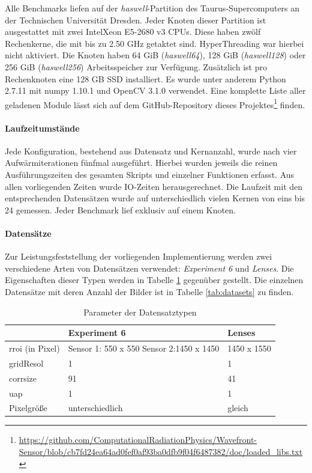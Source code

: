 \begin{sloppypar}
Alle Benchmarks liefen auf der \textit{haswell}-Partition des Taurus-Supercomputers an der Technischen Universität Dresden. Jeder Knoten dieser Partition ist ausgestattet mit zwei Intel\textregistered \mbox{Xeon\textregistered} E5-2680 v3 \glspl{CPU}. Diese haben zwölf Rechenkerne, die mit bis zu 2.50 \gls{GHz} getaktet sind. HyperThreading war hierbei nicht aktiviert. Die Knoten haben 64 \gls{GiB} (\textit{haswell64}), 128 \gls{GiB} (\textit{haswell128}) oder 256 \gls{GiB} (\textit{haswell256}) Arbeitsspeicher zur Verfügung. Zusätzlich ist pro Rechenknoten eine 128 \gls{GB} \gls{SSD} installiert. Es wurde unter anderem Python 2.7.11 mit numpy 1.10.1 und OpenCV 3.1.0 verwendet. Eine komplette Liste aller geladenen Module lässt sich auf dem GitHub-Repository dieses Projektes\footnote{\url{https://github.com/ComputationalRadiationPhysics/Wavefront-Sensor/blob/cb7fd24ea64ad0fef0af93ba0dfb9f04f6487382/doc/loaded_libs.txt}} finden.
\end{sloppypar}

\paragraph{Laufzeitumstände}

Jede Konfiguration, bestehend aus Datensatz und Kernanzahl, wurde nach vier Aufwärmiterationen fünfmal ausgeführt. Hierbei wurden jeweils die reinen Ausführungszeiten des gesamten Skripts und einzelner Funktionen erfasst. Aus allen vorliegenden Zeiten wurde \gls{IO}-Zeiten herausgerechnet. Die Laufzeit mit den entsprechenden Datensätzen wurde auf unterschiedlich vielen Kernen von eins bis 24 gemessen. Jeder Benchmark lief exklusiv auf einem Knoten. 

\paragraph{Datensätze}

Zur Leistungsfeststellung der vorliegenden Implementierung werden zwei verschiedene Arten von Datensätzen verwendet: \textit{Experiment 6} und \textit{Lenses}. Die Eigenschaften dieser Typen werden in Tabelle \ref{tab:dataset_types} gegenüber gestellt. Die einzelnen Datensätze mit deren Anzahl der Bilder ist in Tabelle \ref{tab:datasets} zu finden. 

\begin{table}
	\begin{tabularx}{\textwidth}{@{} XXX @{}}
		\toprule
		& Experiment 6 & Lenses \\
		\hline
		\gls{rroi} (in Pixel) & Sensor 1: 550 x 550 \newline
		Sensor 2:1450 x 1450  & 1450 x 1550 \\
		\gls{gridResol} & 1 & 1 \\
		\gls{corrsize} & 91 & 41 \\
		\gls{uap} & 1 & 1 \\
		Pixelgröße & unterschiedlich & gleich \\
		\bottomrule
	\end{tabularx}
	\caption{Parameter der Datensatztypen}
	\label{tab:dataset_types}
\end{table}

